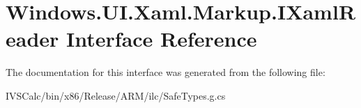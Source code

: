 \hypertarget{interface_windows_1_1_u_i_1_1_xaml_1_1_markup_1_1_i_xaml_reader}{}\section{Windows.\+U\+I.\+Xaml.\+Markup.\+I\+Xaml\+Reader Interface Reference}
\label{interface_windows_1_1_u_i_1_1_xaml_1_1_markup_1_1_i_xaml_reader}


The documentation for this interface was generated from the following file\+:\begin{DoxyCompactItemize}
\item 
I\+V\+S\+Calc/bin/x86/\+Release/\+A\+R\+M/ilc/Safe\+Types.\+g.\+cs\end{DoxyCompactItemize}
